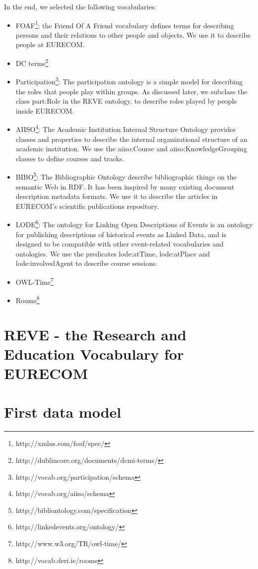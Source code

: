 \documentclass[a4paper,11pt]{report}
\begin{document}
In the end, we selected the following vocabularies: 
\begin{itemize}
\item FOAF\footnote{http://xmlns.com/foaf/spec/}: the Friend Of A Friend vocabulary defines terms for describing persons and their relations to other people and objects. We use it to describe people at EURECOM. 
\item DC terms\footnote{http://dublincore.org/documents/dcmi-terms/}
\item Participation\footnote{http://vocab.org/participation/schema}: The participation ontology is a simple model for describing the roles that people play within groups. As discussed later, we subclass the class part:Role in the REVE ontology, to describe roles played by people inside EURECOM. 
\item AIISO\footnote{http://vocab.org/aiiso/schema}: The Academic Institution Internal Structure Ontology provides classes and properties to describe the internal organizational structure of an academic institution. We use the aiiso:Course and aiiso:KnowledgeGrouping classes to define courses and tracks. 
\item BIBO\footnote{http://bibliontology.com/specification}:  The Bibliographic Ontology describe bibliographic things on the semantic Web in RDF. It has been inspired by many existing document description metadata formats. We use it to describe the articles in EURECOM's scientific publications repository. 
\item LODE\footnote{http://linkedevents.org/ontology/}: The ontology for Linking Open Descriptions of Events is an ontology for publishing descriptions of historical events as Linked Data, and is designed to be compatible with other event-related vocabularies and ontologies. We use the predicates lode:atTime, lode:atPlace and lode:involvedAgent to describe course sessions. 
\item OWL-Time\footnote{http://www.w3.org/TR/owl-time/}
\item Rooms\footnote{http://vocab.deri.ie/rooms}
\end{itemize}
\section{REVE - the Research and Education Vocabulary for EURECOM}
\section{First data model}
\end{document}

